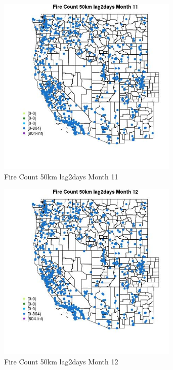\begin{figure} 
\centering  
\includegraphics[width=0.77\textwidth]{Code_Outputs/Report_ML_input_PM25_Step4_part_f_de_duplicated_aves_prioritize_24hr_obswNAs_MapObsMo11Fire_Count_50km_lag2days.jpg} 
\caption{\label{fig:Report_ML_input_PM25_Step4_part_f_de_duplicated_aves_prioritize_24hr_obswNAsMapObsMo11Fire_Count_50km_lag2days}Fire Count 50km lag2days Month 11} 
\end{figure} 
 

\begin{figure} 
\centering  
\includegraphics[width=0.77\textwidth]{Code_Outputs/Report_ML_input_PM25_Step4_part_f_de_duplicated_aves_prioritize_24hr_obswNAs_MapObsMo12Fire_Count_50km_lag2days.jpg} 
\caption{\label{fig:Report_ML_input_PM25_Step4_part_f_de_duplicated_aves_prioritize_24hr_obswNAsMapObsMo12Fire_Count_50km_lag2days}Fire Count 50km lag2days Month 12} 
\end{figure} 
 


